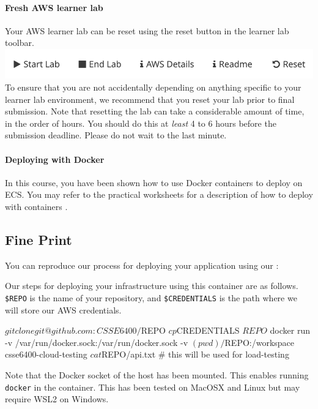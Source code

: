 \documentclass{csse4400}
\begin{document}
\paragraph{Fresh AWS learner lab}
Your AWS learner lab can be reset using the reset button in the learner lab toolbar.
\includegraphics[width=\textwidth]{images/reset-button.png}
To ensure that you are not accidentally depending on anything specific to your learner lab environment, we recommend that you reset your lab prior to final submission. Note that resetting the lab can take a considerable amount of time, in the order of hours. You should do this at \textit{least} 4 to 6 hours before the submission deadline. Please do not wait to the last minute.

\paragraph{Deploying with Docker}
In this course, you have been shown how to use Docker containers to deploy on ECS. You may refer to the practical worksheets for a description of how to deploy with containers \cite{prac-week5}.

\subsection{Fine Print}
You can reproduce our process for deploying your application using our :

Our steps for deploying your infrastructure using this container are as follows.
\texttt{\$REPO} is the name of your repository, and
\texttt{\$CREDENTIALS} is the path where we will store our AWS credentials.
\begin{code}[language=shell]{}
$ git clone git@github.com:CSSE6400/$REPO
$ cp $CREDENTIALS $REPO
$ docker run -v /var/run/docker.sock:/var/run/docker.sock -v $(pwd)/$REPO:/workspace csse6400-cloud-testing
$ cat $REPO/api.txt # this will be used for load-testing
\end{code}

\noindent
Note that the Docker socket of the host has been mounted. This enables running \texttt{docker} in the container. This has been tested on MacOSX and Linux but may require WSL2 on Windows.
\end{document}
